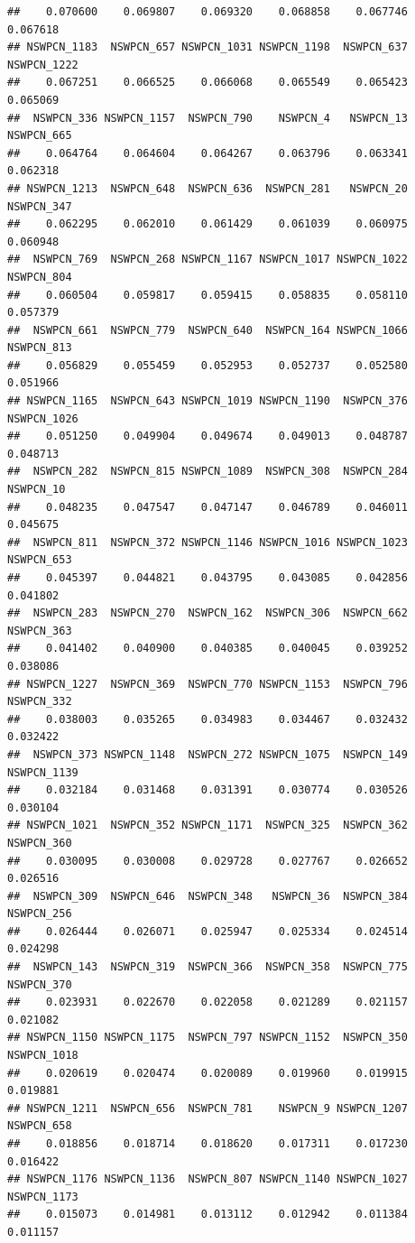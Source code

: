 \documentclass{article}\usepackage[]{graphicx}\usepackage[]{color}
\makeatletter
\newenvironment{kframe}{%
 \def\at@end@of@kframe{}%
 \ifinner\ifhmode%
  \def\at@end@of@kframe{\end{minipage}}%
  \begin{minipage}{\columnwidth}%
 \fi\fi%
 \def\FrameCommand##1{\hskip\@totalleftmargin \hskip-\fboxsep
 \colorbox{shadecolor}{##1}\hskip-\fboxsep
     \hskip-\linewidth \hskip-\@totalleftmargin \hskip\columnwidth}%
 \MakeFramed {\advance\hsize-\width
   \@totalleftmargin\z@ \linewidth\hsize
   \@setminipage}}%
 {\par\unskip\endMakeFramed%
 \at@end@of@kframe}
\newenvironment{knitrout}{}{} %
\makeatother
\begin{document}
\begin{knitrout}
\begin{kframe}
\begin{verbatim}
##    0.070600    0.069807    0.069320    0.068858    0.067746    0.067618 
## NSWPCN_1183  NSWPCN_657 NSWPCN_1031 NSWPCN_1198  NSWPCN_637 NSWPCN_1222 
##    0.067251    0.066525    0.066068    0.065549    0.065423    0.065069 
##  NSWPCN_336 NSWPCN_1157  NSWPCN_790    NSWPCN_4   NSWPCN_13  NSWPCN_665 
##    0.064764    0.064604    0.064267    0.063796    0.063341    0.062318 
## NSWPCN_1213  NSWPCN_648  NSWPCN_636  NSWPCN_281   NSWPCN_20  NSWPCN_347 
##    0.062295    0.062010    0.061429    0.061039    0.060975    0.060948 
##  NSWPCN_769  NSWPCN_268 NSWPCN_1167 NSWPCN_1017 NSWPCN_1022  NSWPCN_804 
##    0.060504    0.059817    0.059415    0.058835    0.058110    0.057379 
##  NSWPCN_661  NSWPCN_779  NSWPCN_640  NSWPCN_164 NSWPCN_1066  NSWPCN_813 
##    0.056829    0.055459    0.052953    0.052737    0.052580    0.051966 
## NSWPCN_1165  NSWPCN_643 NSWPCN_1019 NSWPCN_1190  NSWPCN_376 NSWPCN_1026 
##    0.051250    0.049904    0.049674    0.049013    0.048787    0.048713 
##  NSWPCN_282  NSWPCN_815 NSWPCN_1089  NSWPCN_308  NSWPCN_284   NSWPCN_10 
##    0.048235    0.047547    0.047147    0.046789    0.046011    0.045675 
##  NSWPCN_811  NSWPCN_372 NSWPCN_1146 NSWPCN_1016 NSWPCN_1023  NSWPCN_653 
##    0.045397    0.044821    0.043795    0.043085    0.042856    0.041802 
##  NSWPCN_283  NSWPCN_270  NSWPCN_162  NSWPCN_306  NSWPCN_662  NSWPCN_363 
##    0.041402    0.040900    0.040385    0.040045    0.039252    0.038086 
## NSWPCN_1227  NSWPCN_369  NSWPCN_770 NSWPCN_1153  NSWPCN_796  NSWPCN_332 
##    0.038003    0.035265    0.034983    0.034467    0.032432    0.032422 
##  NSWPCN_373 NSWPCN_1148  NSWPCN_272 NSWPCN_1075  NSWPCN_149 NSWPCN_1139 
##    0.032184    0.031468    0.031391    0.030774    0.030526    0.030104 
## NSWPCN_1021  NSWPCN_352 NSWPCN_1171  NSWPCN_325  NSWPCN_362  NSWPCN_360 
##    0.030095    0.030008    0.029728    0.027767    0.026652    0.026516 
##  NSWPCN_309  NSWPCN_646  NSWPCN_348   NSWPCN_36  NSWPCN_384  NSWPCN_256 
##    0.026444    0.026071    0.025947    0.025334    0.024514    0.024298 
##  NSWPCN_143  NSWPCN_319  NSWPCN_366  NSWPCN_358  NSWPCN_775  NSWPCN_370 
##    0.023931    0.022670    0.022058    0.021289    0.021157    0.021082 
## NSWPCN_1150 NSWPCN_1175  NSWPCN_797 NSWPCN_1152  NSWPCN_350 NSWPCN_1018 
##    0.020619    0.020474    0.020089    0.019960    0.019915    0.019881 
## NSWPCN_1211  NSWPCN_656  NSWPCN_781    NSWPCN_9 NSWPCN_1207  NSWPCN_658 
##    0.018856    0.018714    0.018620    0.017311    0.017230    0.016422 
## NSWPCN_1176 NSWPCN_1136  NSWPCN_807 NSWPCN_1140 NSWPCN_1027 NSWPCN_1173 
##    0.015073    0.014981    0.013112    0.012942    0.011384    0.011157 

\end{verbatim}
\end{kframe}
\end{knitrout}
\end{document}
